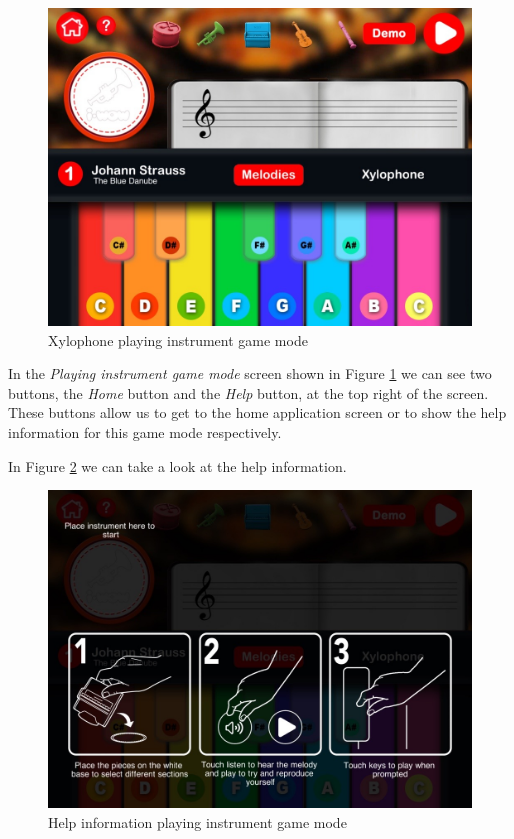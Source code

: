 \begin{figure}[ht!]
	\centering
	\includegraphics[width=400pt]{graphics/use-case/playing_xylo_start_screen.jpg}
	\caption{Xylophone playing instrument game mode}
	\label{fig:playing_xylo_start_screen}
\end{figure}

\FloatBarrier

In the \textit{Playing instrument game mode} screen shown in Figure \ref{fig:playing_xylo_start_screen} we can see two buttons, the \textit{Home} button and the \textit{Help} button, at the top right of the screen. These buttons allow us to get to the home application screen or to show the help information for this game mode respectively.

In Figure \ref{fig:help_playing_screen} we can take a look at the help information.

\begin{figure}[ht!]
	\centering
	\includegraphics[width=400pt]{graphics/use-case/help_playing_screen.jpg}
	\caption{Help information playing instrument game mode}
	\label{fig:help_playing_screen}
\end{figure}


